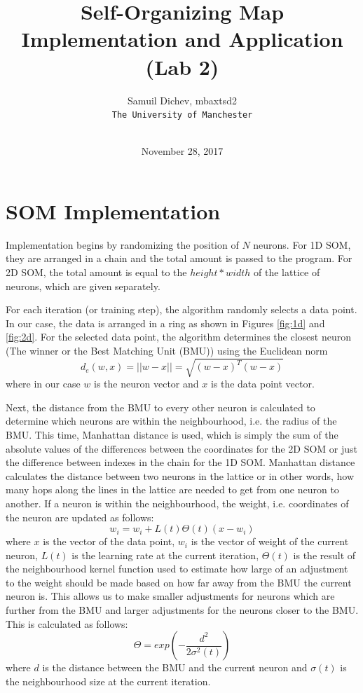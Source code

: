 \documentclass[a4paper,11pt,twocolumn]{article}
\title{Self-Organizing Map Implementation and Application (Lab 2)}
\date{November 28, 2017}
\author{
  Samuil Dichev, mbaxtsd2\\
  \texttt{The University of Manchester}\\
  \TextField{Lab Machine}\\
}
\begin{document}
\maketitle

\section{SOM Implementation}
Implementation begins by randomizing the position of $N$ neurons. For 1D SOM, they are arranged in a chain and the total amount is passed to the program. For 2D SOM, the total amount is equal to the $height * width$ of the lattice of neurons, which are given separately.

For each iteration (or training step), the algorithm randomly selects a data point. In our case, the data is arranged in a ring as shown in Figures \ref{fig:1d} and \ref{fig:2d}. For the selected data point, the algorithm determines the closest neuron (The winner or the Best Matching Unit (BMU)) using the Euclidean norm \[d_e(w,x) = ||w - x|| = \sqrt{(w - x)^T(w-x)}\] where in our case $w$ is the neuron vector and $x$ is the data point vector.

Next, the distance from the BMU to every other neuron is calculated to determine which neurons are within the neighbourhood, i.e. the radius of the BMU. This time, Manhattan distance is used, which is simply the sum of the absolute values of the differences between the coordinates for the 2D SOM or just the difference between indexes in the chain for the 1D SOM. Manhattan distance calculates the distance between two neurons in the lattice or in other words, how many hops along the lines in the lattice are needed to get from one neuron to another.
If a neuron is within the neighbourhood, the weight, i.e. coordinates of the neuron are updated as follows: \[w_i = w_i + L(t)\Theta(t)(x - w_i) \] where $x$ is the vector of the data point, $w_i$ is the vector of weight of the current neuron, $L(t)$ is the learning rate at the current iteration, $\Theta(t)$ is the result of the neighbourhood kernel function used to estimate how large of an adjustment to the weight should be made based on how far away from the BMU the current neuron is. This allows us to make smaller adjustments for neurons which are further from the BMU and larger adjustments for the neurons closer to the BMU. This is calculated as follows: \[\Theta = exp(-\frac{d^2}{2\sigma^2(t)}) \] where $d$ is the distance between the BMU and the current neuron and $\sigma(t)$ is the neighbourhood size at the current iteration. 
\end{document}
